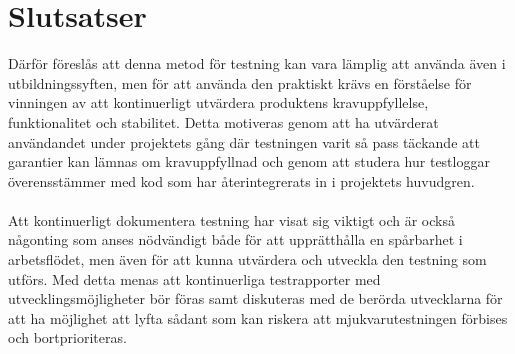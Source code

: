 \section{Slutsatser}
\label{cha:joakim-conclusion}
Därför föreslås att denna metod för testning kan vara lämplig att använda även i utbildningssyften, men för att använda den praktiskt krävs en förståelse för vinningen av att kontinuerligt utvärdera produktens kravuppfyllelse, funktionalitet och stabilitet. Detta motiveras genom att ha utvärderat användandet under projektets gång där testningen varit så pass täckande att garantier kan lämnas om kravuppfyllnad och genom att studera hur testloggar överensstämmer med kod som har återintegrerats in i projektets huvudgren. \\
\\
Att kontinuerligt dokumentera testning har visat sig viktigt och är också någonting som anses nödvändigt både för att upprätthålla en spårbarhet i arbetsflödet, men även för att kunna utvärdera och utveckla den testning som utförs. Med detta menas att kontinuerliga testrapporter med utvecklingsmöjligheter bör föras samt diskuteras med de berörda utvecklarna för att ha möjlighet att lyfta sådant som kan riskera att mjukvarutestningen förbises och bortprioriteras.

